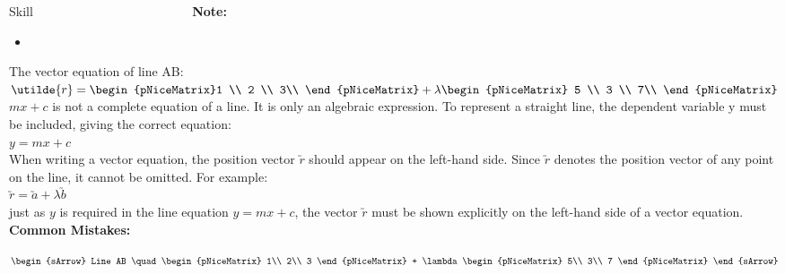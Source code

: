 \clearpage\noindent%

\begin{boxSkill}{Skill  $ \quad \quad \quad \quad \quad \quad \quad \quad \quad \quad \quad \quad $ }   %
    \noindent%
	\textbf{Note:}
	\begin{itemize}[leftmargin=0.8cm]
	     \item[] $\qquad\qquad\qquad     $
 
	\end{itemize}
	
	
	\tcbline
			 The vector equation of line AB: $ \utilde{r}  =  \begin{pNiceMatrix}1 \\ 2 \\ 3\\ \end{pNiceMatrix} +  \lambda  \begin{pNiceMatrix} 5 \\ 3 \\ 7\\ \end{pNiceMatrix} $\\
 			 $mx+c$ is not a complete equation of a line. It is only an algebraic expression. To represent a straight line, the dependent variable  y must be included, giving the correct equation: \\
                         $    y=mx+c $\\  
             When writing a vector equation, the position vector $\utilde{r}$ should appear on the left-hand side. Since  $\utilde{r}$ denotes the position vector of any point on the line, it cannot be omitted. For example:\\
                         $ \utilde{r} =\utilde{a}+λ\utilde{b} $  \\   
			 just as $y$ is required in the line equation $y=mx+c$, the vector $\utilde{r}$ must be shown explicitly on the left-hand side of a vector equation.\\
    \textbf{Common Mistakes:}\\[0.6cm]
	\begin{warningEnv}
	    $\begin{sArrow}
            Line AB \quad  \begin{pNiceMatrix} 1\\ 2\\ 3 \end{pNiceMatrix} + \lambda \begin{pNiceMatrix} 5\\ 3\\ 7 \end{pNiceMatrix} 
		 \end{sArrow}$		   
    \end{warningEnv}
\end{boxSkill}

